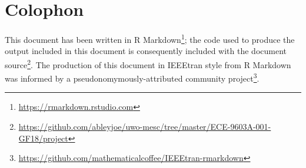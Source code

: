 \documentclass[conference]{IEEEtran}
\begin{document}
\section{Colophon}\label{sec:colophon}

This document has been written in R
Markdown\footnote{\url{https://rmarkdown.rstudio.com}}; the code used to
produce the output included in this document is consequently included
with the document
source\footnote{\url{https://github.com/ableyjoe/uwo-mesc/tree/master/ECE-9603A-001-GF18/project}}.
The production of this document in IEEEtran style from R Markdown was
informed by a pseudonomymously-attributed community
project\footnote{\url{https://github.com/mathematicalcoffee/IEEEtran-rmarkdown}}.


\end{document}

